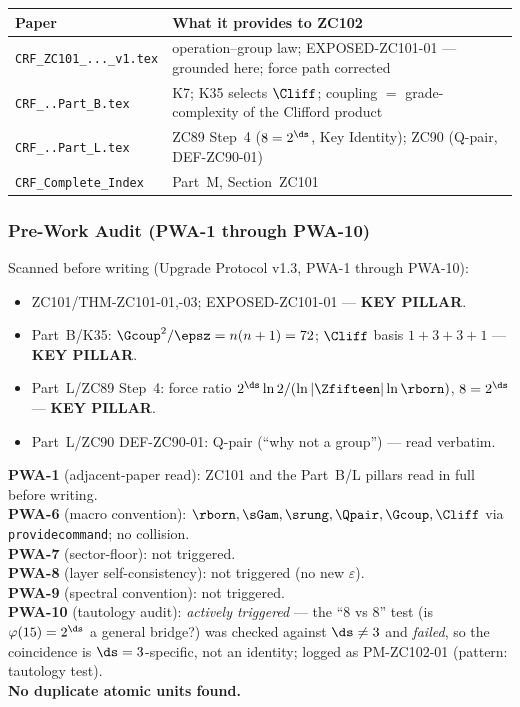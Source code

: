 \documentclass[12pt, a4paper]{article}
\begin{document}
\begin{keybox}[title={Companion Papers --- ZC102}]
{\small\renewcommand{\arraystretch}{1.25}
\begin{center}
\begin{tabular}{@{}p{5.0cm}p{7.5cm}@{}}
\toprule
\textbf{Paper} & \textbf{What it provides to ZC102} \\
\midrule
\texttt{CRF\_ZC101\_...\_v1.tex}
  & operation--group law; EXPOSED-ZC101-01 --- grounded here; force path corrected \\
\texttt{CRF\_..Part\_B.tex}
  & K7; K35 selects $\Cliff$; coupling $=$ grade-complexity of the Clifford product \\
\texttt{CRF\_..Part\_L.tex}
  & ZC89 Step~4 ($8=2^{\ds}$, Key Identity); ZC90 (Q-pair, DEF-ZC90-01) \\
\texttt{CRF\_Complete\_Index}
  & Part~M, Section~ZC101 \\
\bottomrule
\end{tabular}
\end{center}}
\end{keybox}

\subsubsection{Pre-Work Audit (PWA-1 through PWA-10)}

\begin{formalbox}[title={Pre-Work Audit Record --- ZC102}]
Scanned before writing (Upgrade Protocol v1.3, PWA-1 through PWA-10):
\begin{itemize}[leftmargin=2em, noitemsep]
  \item ZC101/THM-ZC101-01,-03; EXPOSED-ZC101-01 --- \textbf{KEY PILLAR}.
  \item Part~B/K35: $\Gcoup^2/\epsz=n(n+1)=72$; $\Cliff$ basis $1{+}3{+}3{+}1$ --- \textbf{KEY PILLAR}.
  \item Part~L/ZC89 Step~4: force ratio $2^{\ds}\ln2/(\ln|\Zfifteen|\ln\rborn)$, $8=2^{\ds}$ --- \textbf{KEY PILLAR}.
  \item Part~L/ZC90 DEF-ZC90-01: Q-pair (``why not a group'') --- read verbatim.
\end{itemize}

\textbf{PWA-1} (adjacent-paper read): ZC101 and the Part~B/L pillars read in
full before writing.\\
\textbf{PWA-6} (macro convention): $\rborn,\sGam,\srung,\Qpair,\Gcoup,\Cliff$ via
\texttt{providecommand}; no collision.\\
\textbf{PWA-7} (sector-floor): not triggered.\\
\textbf{PWA-8} (layer self-consistency): not triggered (no new $\varepsilon$).\\
\textbf{PWA-9} (spectral convention): not triggered.\\
\textbf{PWA-10} (tautology audit): \emph{actively triggered} --- the ``$8$ vs
$8$'' test (is $\varphi(15)=2^{\ds}$ a general bridge?) was checked against
$\ds\ne3$ and \emph{failed}, so the coincidence is $\ds=3$-specific, not an
identity; logged as PM-ZC102-01 (pattern: tautology test).\\
\textbf{No duplicate atomic units found.}
\end{formalbox}
\end{document}
